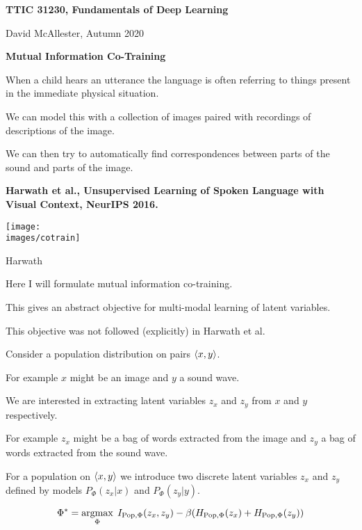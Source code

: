 





{\Huge
  \centerline{\bf TTIC 31230,  Fundamentals of Deep Learning}
  \vfill
  \centerline{David McAllester, Autumn   2020}
  \vfill
  \centerline{\bf Mutual Information Co-Training}
  \vfill
  \vfill



When a child hears an utterance the language is often referring to things present in the immediate physical situation.

\vfill
We can model this with a collection of images paired with recordings of descriptions of the image.

\vfill
We can then try to automatically find correspondences between parts of the sound and parts of the image.

\vfill
{\bf Harwath et al., Unsupervised Learning of Spoken Language with Visual Context, NeurIPS 2016.}


\centerline{\texttt{[image: \\images/cotrain]}}

\centerline{Harwath}



Here I will formulate mutual information co-training.

\vfill
This gives an abstract objective for multi-modal learning of latent variables.

\vfill
This objective was not followed (explicitly) in Harwath et al.


Consider a population distribution on pairs ${\mbox{$\langle x,y\rangle$}}$.

\vfill
For example $x$ might be an image and $y$ a sound wave.

\vfill
We are interested in extracting latent variables $z_x$ and $z_y$ from $x$ and $y$ respectively.

\vfill
For example $z_x$ might be a bag of words extracted from the image and $z_y$ a bag of words extracted from the sound wave.



For a population on ${\mbox{$\langle x,y\rangle$}}$ we introduce two discrete latent variables $z_x$ and $z_y$ defined by
models {\color{red} $P_\Phi(z_x|x)$} and {\color{red} $P_\Phi(z_y|y)$}.

\vfill
$$\Phi^* = \operatorname*{argmax}_{\Phi} \; I_{\mathrm{Pop},\Phi}(z_x,z_y) - \beta (H_{\mathrm{Pop},\Phi}(z_x) + H_{\mathrm{Pop},\Phi}(z_y))$$

}
